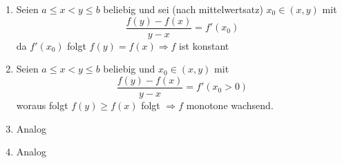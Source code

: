 \begin{beweis}{}
\begin{enumerate}
\item Seien $a\leq x<y\leq b$ beliebig und sei (nach mittelwertsatz) $x_0\in\left( x,y\right)$ mit 
\[\frac{{f\left( y \right) - f\left( x \right)}}{{y - x}} = f'\left( {{x_0}} \right)\]
da $f'\left( x_0\right)$ folgt $f\left( y\right)=f(x)\Rightarrow f$ ist konstant
\item Seien $a\leq x<y\leq b$ beliebig und  $x_0\in\left( x,y\right)$ mit 
\[\frac{{f\left( y \right) - f\left( x \right)}}{{y - x}} = f'\left( {{x_0}}>0 \right)\]
woraus folgt  $f\left( y\right)\geq f(x)$  folgt $\Rightarrow f$ monotone wachsend.
\item Analog
\item Analog
\end{enumerate}
\end{beweis}

